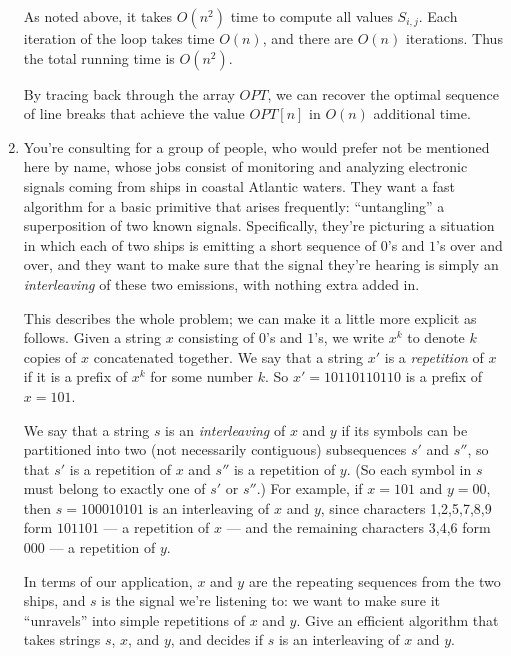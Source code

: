 \documentclass[12pt]{article}
\begin{document}
\begin{enumerate}
{As noted above, it takes $O(n^2)$ time to compute all values $S_{i,j}$.
Each iteration of the loop takes time $O(n)$, and there are
$O(n)$ iterations.
Thus the total running time is $O(n^2)$.

By tracing back through the array $OPT$, we can recover
the optimal sequence of line breaks that achieve the
value $OPT[n]$ in $O(n)$ additional time.

}


\item

You're consulting for a group of people,
who would prefer not be mentioned here by name,
whose jobs consist of
monitoring and analyzing electronic signals coming from ships in
coastal Atlantic waters.
They want a fast algorithm for a basic primitive that arises frequently:
``untangling'' a superposition of two known signals.
Specifically, they're picturing a situation
in which each of two ships is emitting a short sequence
of $0$'s and $1$'s over and over, and they want to make sure
that the signal they're hearing is simply an {\em interleaving}
of these two emissions, with nothing extra added in.

This describes the whole problem;
we can make it a little more explicit as follows.
Given a string $x$ consisting of $0$'s and $1$'s,
we write $x^k$ to denote $k$ copies of $x$ concatenated together.
We say that a string $x'$ is a {\em repetition} of $x$
if it is a prefix of $x^k$ for some number $k$.
So $x' = 10110110110$ is a prefix of $x = 101$.

We say that a string $s$ is an {\em interleaving} of $x$ and $y$
if its symbols can be partitioned into two
(not necessarily contiguous) subsequences $s'$ and $s''$,
so that $s'$ is a repetition of $x$ and $s''$ is a repetition of $y$.
(So each symbol in $s$ must belong to exactly one of $s'$ or $s''$.)
For example, if $x = 101$ and $y = 00$, then $s = 100010101$ is
an interleaving of $x$ and $y$, since characters 1,2,5,7,8,9
form $101101$ --- a repetition of $x$ ---
and the remaining characters 3,4,6 form $000$ --- a repetition of $y$.

In terms of our application, $x$ and $y$ are the repeating sequences
from the two ships, and $s$ is the signal we're listening to:
we want to make sure it ``unravels'' into simple repetitions of $x$ and $y$.
Give an efficient algorithm that takes strings $s$, $x$, and $y$,
and decides if $s$ is an interleaving of $x$ and $y$.


\end{enumerate}
\end{document}
